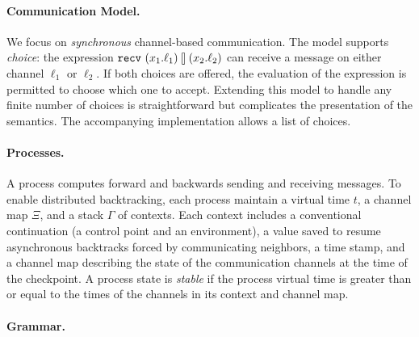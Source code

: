\documentclass{article}
\begin{document}
\paragraph*{Communication Model.} We focus on \emph{synchronous}
channel-based communication. The model supports \emph{choice}: the expression
$\texttt{recv}~(x_1.\ell_1) \talloblong (x_2.\ell_2)$ can receive a message on either channel
$\ell_1$ or $\ell_2$. If both choices are offered, the evaluation of the
expression is permitted to choose which one to accept. Extending this model
to handle any finite number of choices is straightforward but complicates the
presentation of the semantics. The accompanying implementation allows a list
of choices.

\paragraph*{Processes.} A process computes forward and backwards sending and
receiving messages. To enable distributed backtracking, each process maintain
a virtual time $t$, a channel map $\Xi$, and a stack $\Gamma$ of
contexts. Each context includes a conventional continuation (a control point
and an environment), a value saved to resume asynchronous backtracks forced
by communicating neighbors, a time stamp, and a channel map describing the
state of the communication channels at the time of the checkpoint. A process
state is \emph{stable} if the process virtual time is greater than or equal
to the times of the channels in its context and channel map.

\paragraph*{Grammar.}
\end{document}
